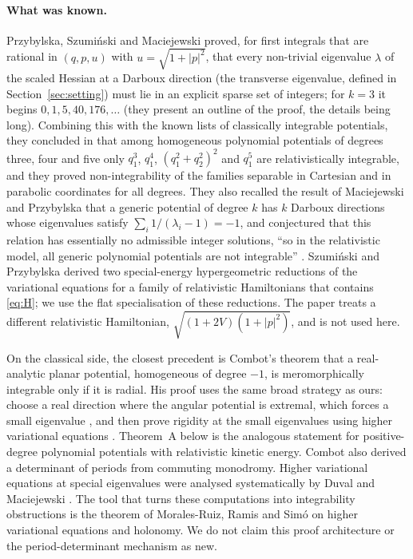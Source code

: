 \documentclass[11pt]{article}
\numberwithin{equation}{section}
\theoremstyle{definition}
\theoremstyle{remark}
\begin{document}
\paragraph{What was known.}
Przybylska, Szumi\'nski and Maciejewski \cite[Theorem~3]{PSM23} proved, for first integrals that are rational in
$(q,p,u)$ with $u=\sqrt{1+|p|^2}$, that every non-trivial eigenvalue $\lambda$ of the scaled Hessian at a Darboux direction (the transverse eigenvalue, defined in Section~\ref{sec:setting}) must lie in an explicit sparse set of integers; for $k=3$ it begins
$0,1,5,40,176,\dots$ (they present an outline of the proof, the details being long). Combining this with the known
lists of classically integrable potentials, they concluded in \cite[Sec.~V]{PSM23} that among homogeneous
polynomial potentials of degrees three, four and five only $q_1^3$, $q_1^4$, $(q_1^2+q_2^2)^2$ and $q_1^5$ are
relativistically integrable, and they proved non-integrability of the families separable in Cartesian and in parabolic
coordinates for all degrees. They also recalled the result of Maciejewski and Przybylska \cite[Corollary~2.1, Theorem~1.2]{MP05} that a generic potential of degree $k$ has $k$ Darboux directions whose eigenvalues satisfy $\sum_i 1/(\lambda_i-1)=-1$, and conjectured that this relation has essentially no admissible
integer solutions, ``so in the relativistic model, all generic polynomial potentials are not integrable''
\cite[Sec.~VI]{PSM23}. Szumi\'nski and Przybylska \cite[Sec.~3.1, eqs.~(31)--(34), and Theorem~3]{SP25} derived two special-energy
hypergeometric reductions of the variational equations for a family of relativistic Hamiltonians that contains
\eqref{eq:H}; we use the flat specialisation of these reductions. The paper \cite{SPM24} treats a different
relativistic Hamiltonian, $\sqrt{(1+2V)(1+|p|^2)}$, and is not used here.

On the classical side, the closest precedent is Combot's theorem \cite[Theorem~A]{Combot16} that a real-analytic planar potential, homogeneous of degree $-1$, is meromorphically integrable only if it is radial. His proof uses the same broad strategy as ours: choose a real direction where the angular potential is extremal, which forces a small eigenvalue \cite[Lemma~3.1]{Combot16}, and then prove rigidity at the small eigenvalues using higher variational equations \cite[Theorem~B, Lemma~4.5]{Combot16}. Theorem~A below is the analogous statement for positive-degree polynomial potentials with relativistic kinetic energy. Combot \cite[Sec.~4.3, Lemmas~6--7]{Combot13} also derived
a determinant of periods from commuting monodromy. Higher variational equations at special eigenvalues were analysed
systematically by Duval and Maciejewski \cite{DM15}. The tool that turns these computations into integrability
obstructions is the theorem of Morales-Ruiz, Ramis and Sim\'o \cite{MRS07} on higher variational equations and
holonomy. We do not claim this proof architecture or the period-determinant mechanism as new.
\end{document}
